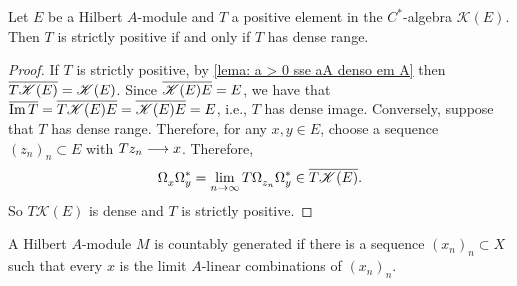 \begin{proposicao}
\label{prop: T > 0 sse Im T densa}
Let $E$ be a Hilbert $A$-module and $T$ a positive element in the $C^*$-algebra $\mathscr K(E)$. Then $T$ is strictly positive if and only if $T$ has dense range.
\begin{proof}
If $T$ is strictly positive, by \ref{lema: a > 0 sse aA denso em A} then $\overline{T\mathscr K(E)} = \mathscr K(E)$. Since $\overline{\mathscr K(E)E} = E$, we have that $\overline{\operatorname{Im} T} = \overline{T\mathscr K(E)E} = \overline{\mathscr K(E)E} = E$, i.e., $T$ has dense image. Conversely, suppose that $T$ has dense range. Therefore, for any $x,y \in E$, choose a sequence $(z_n)_n\subset E$ with $Tz_n \longrightarrow x$. Therefore,
\[
\Omega_x^{\vphantom{*}}\Omega_y^* = \lim_{n\to \infty} T\Omega_{z_n}^{\vphantom{*}}\Omega_y^* \in \overline{T\mathscr K(E)}.
\]
So $T\mathscr K(E)$ is dense and $T$ is strictly positive.
\end{proof}
\end{proposicao}

A Hilbert $A$-module $M$ is countably generated if there is a sequence $\left(x_{n}\right)_n \subset X$ such that every $x$ is the limit $A$-linear combinations of $\left(x_{n}\right)_n$.

